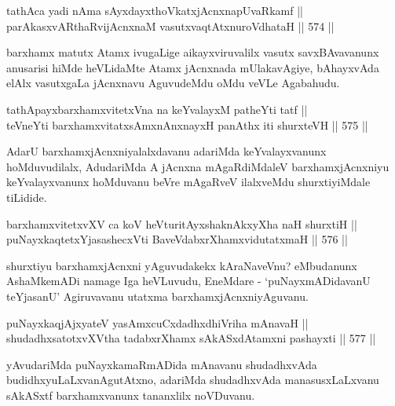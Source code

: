 \begin{shl}
tathAca yadi nAma sAyxdayxthoVkatxjAcnxnapUvaRkamf || \\
parAkasxvARthaRvijAcnxnaM vasutxvaqtAtxnuroVdhataH \hfill || 574 ||  
\end{shl}

\begin{artha}
barxhamx matutx Atamx ivugaLige aikayxviruvalilx vasutx savxBAvavanunx
anusarisi hiMde heVLidaMte Atamx jAcnxnada mUlakavAgiye, bAhayxvAda
elAlx vasutxgaLa jAcnxnavu AguvudeMdu oMdu veVLe Agabahudu.
\end{artha}

\begin{shl}
tathA\s payxbarxhamxvitetxVna na keYvalayxM patheYti tatf || \\
teVneYti barxhamxvitatxsAmxnAnxnayxH panAthx iti shurxteVH \hfill || 575 ||  
\end{shl}

\begin{artha}
AdarU barxhamxjAcnxniyalalxdavanu adariMda keYvalayxvanunx
hoMduvudilalx, AdudariMda A jAcnxna mAgaRdiMdaleV barxhamxjAcnxniyu
keYvalayxvanunx hoMduvanu beVre mAgaRveV ilalxveMdu shurxtiyiMdale
tiLidide.
\end{artha}


\begin{shl}
barxhamxvitetxvXV ca koV heVturitAyxshaknAkxyX\s \s ha naH shurxtiH || \\
puNayxkaqtetxYjasashecxVti BaveVdabxrXhamxvidutatxmaH \hfill || 576 ||  
\end{shl}

\begin{artha}
shurxtiyu barxhamxjAcnxni yAguvudakekx kAraNaveVnu? eMbudanunx
AshaMkemADi namage Iga heVLuvudu, EneMdare  - `puNayxmADidavanU
teYjasanU' Agiruvavanu utatxma barxhamxjAcnxniyAguvanu.
\end{artha}


\begin{shl}
puNayxkaqjAjxyateV yasAmxcuCxdadhxdhiVriha mAnavaH || \\
shudadhxsatotxvXV\s tha tadabxrXhamx sAkASxdAtamxni pashayxti \hfill || 577 ||  
\end{shl}

\begin{artha}
yAvudariMda puNayxkamaRmADida mAnavanu shudadhxvAda
budidhxyuLaLxvanAgutAtxno, adariMda shudadhxvAda manasusxLaLxvanu
sAkASxtf barxhamxvanunx tananxlilx noVDuvanu.
\end{artha}


